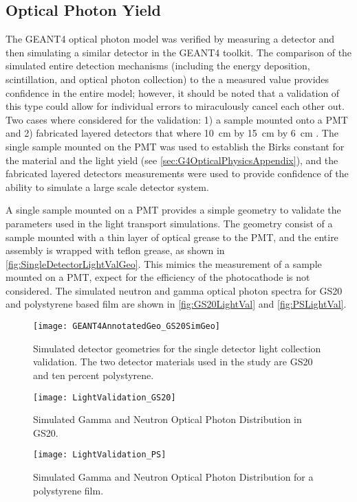 \subsection{Optical Photon Yield}
\label{sec:OpticalPhotonValidation}
The GEANT4 optical photon model was verified by measuring a detector and then simulating a similar detector in the GEANT4 toolkit. 
The comparison of the simulated entire  detection mechanisms (including the energy deposition, scintillation, and optical photon collection) to the a measured value provides confidence in the entire model; however, it should be noted that a validation of this type could allow for individual errors to miraculously cancel each other out.
Two cases where considered for the validation: 1) a sample mounted onto a PMT and 2) fabricated layered detectors that where  \SI{10}{cm} by \SI{15}{cm} by \SI{6}{cm} .
The single sample mounted on the PMT was used to establish the Birks constant for the material and the light yield (see \autoref{sec:G4OpticalPhysicsAppendix}), and the fabricated layered detectors measurements were used to provide confidence of the ability to simulate a large scale detector system.

A single sample mounted on a PMT provides a simple geometry to validate the parameters used in the light transport simulations. 
The geometry consist of a sample mounted with a thin layer of optical grease to the PMT, and the entire assembly is wrapped with teflon grease, as shown in \autoref{fig:SingleDetectorLightValGeo}.
This mimics the measurement of a sample mounted on a PMT, expect for the efficiency of the photocathode is not considered.
The simulated neutron and gamma optical photon spectra for GS20 and polystyrene based film are shown in \autoref{fig:GS20LightVal} and \autoref{fig:PSLightVal}.
\begin{figure}
	\centering
	\texttt{[image: GEANT4AnnotatedGeo\_GS20SimGeo]}
	\caption[Simulated Detector Geometry for Single Detectors]{Simulated detector geometries for the single detector light collection validation. The two detector materials used in the study are GS20 and ten percent  polystyrene.}
	\label{fig:SingleDetectorLightValGeo}
\end{figure}
\begin{figure}
	\centering
	\texttt{[image: LightValidation\_GS20]}
	\caption{Simulated Gamma and Neutron Optical Photon Distribution in GS20. \LightYieldEDepSimGeo}
	\label{fig:GS20LightVal}
\end{figure}
\begin{figure}
	\centering
	\texttt{[image: LightValidation\_PS]}
	\caption{Simulated Gamma and Neutron Optical Photon Distribution for a polystyrene film. \LightYieldEDepSimGeo}
	\label{fig:PSLightVal}
\end{figure}

